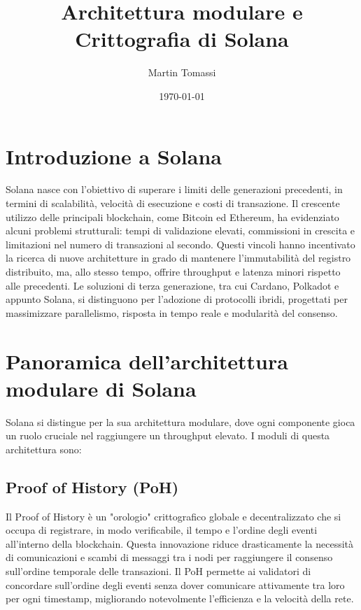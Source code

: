 \documentclass[a4paper,12pt]{report}
\title{Architettura modulare e Crittografia di Solana}
\author{Martin Tomassi}
\date{\today}
\begin{document}
	\maketitle
	\tableofcontents
	
	\chapter{Introduzione a Solana}
	Solana nasce con l’obiettivo di superare i limiti delle generazioni precedenti, in termini di scalabilità, velocità di esecuzione e costi di transazione. Il crescente utilizzo delle principali blockchain, come Bitcoin ed Ethereum, ha evidenziato alcuni problemi strutturali: tempi di validazione elevati, commissioni in crescita e limitazioni nel numero di transazioni al secondo. Questi vincoli hanno incentivato la ricerca di nuove architetture in grado di mantenere l’immutabilità del registro distribuito, ma, allo stesso tempo, offrire throughput e latenza minori rispetto alle precedenti. Le soluzioni di terza generazione, tra cui Cardano, Polkadot e appunto Solana, si distinguono per l’adozione di protocolli ibridi, progettati per massimizzare parallelismo, risposta in tempo reale e modularità del consenso.
	
	\chapter{Panoramica dell'architettura modulare di Solana}
	
	Solana si distingue per la sua architettura modulare, dove ogni componente gioca un ruolo cruciale nel raggiungere un throughput elevato. I moduli di questa architettura sono:
	
	\section{Proof of History (PoH)}
	Il Proof of History è un "orologio" crittografico globale e decentralizzato che si occupa di registrare, in modo verificabile, il tempo e l'ordine degli eventi all'interno della blockchain. Questa innovazione riduce drasticamente la necessità di comunicazioni e scambi di messaggi tra i nodi per raggiungere il consenso sull'ordine temporale delle transazioni. Il PoH permette ai validatori di concordare sull'ordine degli eventi senza dover comunicare attivamente tra loro per ogni timestamp, migliorando notevolmente l'efficienza e la velocità della rete.
	
\end{document}
